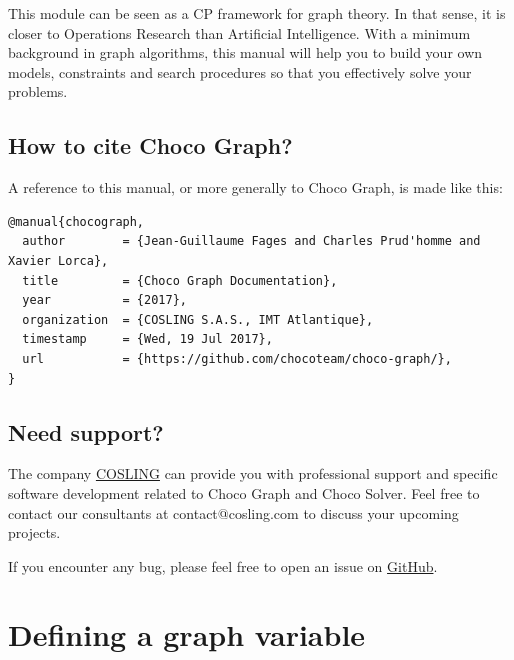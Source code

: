 \documentclass{article}
\begin{document}
This module can be seen as a CP framework for graph theory. In that sense, it is closer to Operations Research than Artificial Intelligence. With a minimum background in graph algorithms, this manual will help you to build your own models, constraints and search procedures so that you effectively solve your problems. 



\subsection{How to cite Choco Graph?}

A reference to this manual, or more generally to Choco Graph, is made like this:
\begin{lstlisting}
@manual{chocograph,
  author        = {Jean-Guillaume Fages and Charles Prud'homme and Xavier Lorca},
  title         = {Choco Graph Documentation},
  year          = {2017},
  organization  = {COSLING S.A.S., IMT Atlantique},
  timestamp     = {Wed, 19 Jul 2017},
  url           = {https://github.com/chocoteam/choco-graph/},
}
\end{lstlisting}

\subsection{Need support?}

The company \href{https://www.cosling.com/}{COSLING} can provide you with professional support and specific software development related to Choco Graph and Choco Solver. Feel free to contact our consultants at contact@cosling.com to discuss your upcoming projects.



If you encounter any bug, please feel free to open an issue on \href{https://github.com/chocoteam/choco-graph/}{GitHub}.

\newpage{}
\section{Defining a graph variable}
\end{document}

